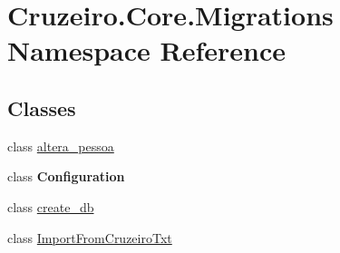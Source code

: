 \hypertarget{namespace_cruzeiro_1_1_core_1_1_migrations}{}\section{Cruzeiro.\+Core.\+Migrations Namespace Reference}
\label{namespace_cruzeiro_1_1_core_1_1_migrations}
\subsection*{Classes}
\begin{DoxyCompactItemize}
\item 
class \hyperlink{class_cruzeiro_1_1_core_1_1_migrations_1_1altera__pessoa}{altera\+\_\+pessoa}
\item 
class {\bfseries Configuration}
\item 
class \hyperlink{class_cruzeiro_1_1_core_1_1_migrations_1_1create__db}{create\+\_\+db}
\item 
class \hyperlink{class_cruzeiro_1_1_core_1_1_migrations_1_1_import_from_cruzeiro_txt}{Import\+From\+Cruzeiro\+Txt}
\end{DoxyCompactItemize}

